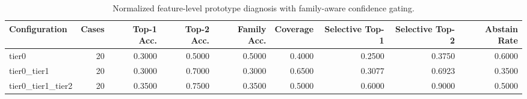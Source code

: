 \begin{table}[t]
\centering
\caption{Normalized feature-level prototype diagnosis with family-aware confidence gating.}
\label{tab:dice_stressor_hierarchical_diagnosis}
\footnotesize
\begin{tabular}{lrrrrrrrr}
\toprule
Configuration & Cases & Top-1 Acc. & Top-2 Acc. & Family Acc. & Coverage & Selective Top-1 & Selective Top-2 & Abstain Rate \\
\midrule
tier0 & 20 & 0.3000 & 0.5000 & 0.5000 & 0.4000 & 0.2500 & 0.3750 & 0.6000 \\
tier0_tier1 & 20 & 0.3000 & 0.7000 & 0.3000 & 0.6500 & 0.3077 & 0.6923 & 0.3500 \\
tier0_tier1_tier2 & 20 & 0.3500 & 0.7500 & 0.3500 & 0.5000 & 0.6000 & 0.9000 & 0.5000 \\
\bottomrule
\end{tabular}

\end{table}

